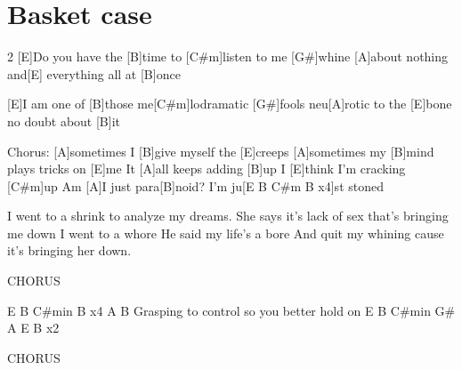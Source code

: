 \section{Basket case}
\begin{guitar}
\begin{multicols}{2}
[E]Do you have the [B]time
to [C#m]listen to me [G#]whine
[A]about nothing and[E] everything
all at [B]once

[E]I am one of [B]those
me[C#m]lodramatic [G#]fools
neu[A]rotic to the [E]bone
no doubt about [B]it


Chorus:
[A]sometimes I [B]give myself the [E]creeps
[A]sometimes my [B]mind plays tricks on [E]me
It [A]all keeps adding [B]up
I [E]think I'm cracking [C#m]up
Am [A]I just para[B]noid?
I'm ju[E B C#m B x4]st stoned


I went to a shrink
to analyze my dreams.
She says it's lack of sex
that's bringing me down
I went to a whore
He said my life's a bore
And quit my whining cause
it's bringing her down.


CHORUS

E B C\#min B x4
    A          B
Grasping to control
so you better hold on
E B C\#min G\# A E B x2

CHORUS
\end{multicols}
\end{guitar}
